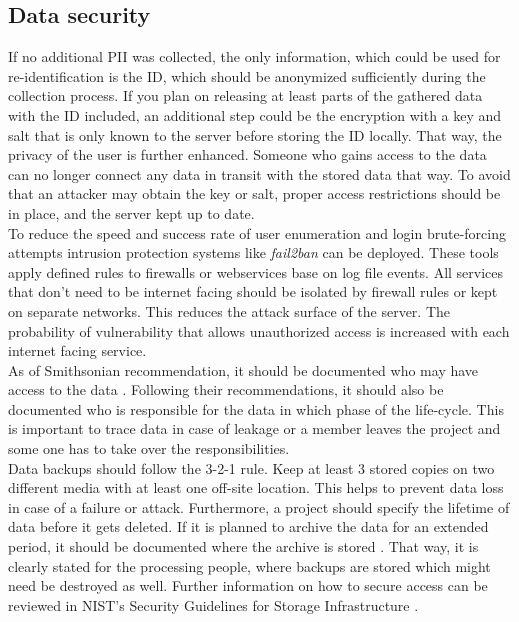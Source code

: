     \subsection{Data security}
        \label{subsec:data_storage}    
        If no additional PII was collected, the only information, which could be used for re-identification is the ID, which should be anonymized sufficiently during the collection process. If you plan on releasing at least parts of the gathered data with the ID included, an additional step could be the encryption with a key and salt that is only known to the server before storing the ID locally. That way, the privacy of the user is further enhanced. Someone who gains access to the data can no longer connect any data in transit with the stored data that way.
        To avoid that an attacker may obtain the key or salt, proper access restrictions should be in place, and the server kept up to date.\\
        To reduce the speed and success rate of user enumeration and login brute-forcing attempts intrusion protection systems like \textit{fail2ban} \cite{noauthor_fail2ban_nodate} can be deployed. These tools apply defined rules to firewalls or webservices base on log file events. All services that don't need to be internet facing should be isolated by firewall rules or kept on separate networks. This reduces the attack surface of the server. The probability of vulnerability that allows unauthorized access is increased with each internet facing service.\\
        As of Smithsonian recommendation, it should be documented who may have access to the data \cite{noauthor_best_2018}. Following their recommendations, it should also be documented who is responsible for the data in which phase of the life-cycle. This is important to trace data in case of leakage or a member leaves the project and some one has to take over the responsibilities.\\
        Data backups should follow the 3-2-1 rule. Keep at least 3 stored copies on two different media with at least one off-site location. This helps to prevent data loss in case of a failure or attack.
        Furthermore, a project should specify the lifetime of data before it gets deleted. If it is planned to archive the data for an extended period, it should be documented where the archive is stored \cite{noauthor_best_2018}. That way, it is clearly stated for the processing people, where backups are stored which might need be destroyed as well.
        Further information on how to secure access can be reviewed in NIST's Security Guidelines for Storage Infrastructure \cite{chandramouli_security_2020}. \\
